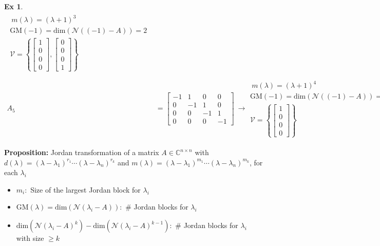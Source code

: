 \documentclass[twoside]{article}
\newtheorem{exmp}[theorem]{Ex}
\begin{document}
\begin{exmp}
\begin{align*}
\begin{array}{c} \ m(\lambda) = (\lambda + 1)^3 \\ \mathrm{GM}(-1) = \mathrm{dim}\left( \mathcal{N}((-1) - A) \right) = 2 
\\
\mathcal{V} = \left\lbrace  \left[ \begin{array}{c} 1 \\ 0 \\ 0 \\ 0  \end{array} \right] ,   \left[ \begin{array}{c} 0  \\ 0 \\ 0 \\ 1 \end{array} \right]  \right\rbrace 
\end{array}
\\
\\
A_5 &=   \left[ \begin{array}{cccc} -1 & 1 & 0 & 0  \\ 0 & -1 & 1 & 0 \\ 0 & 0 & -1 & 1 \\ 0 & 0 & 0 & -1 \end{array} \right] \ \rightarrow  
\begin{array}{c} \ m(\lambda) = (\lambda + 1)^4 \\ \mathrm{GM}(-1) = \mathrm{dim}\left( \mathcal{N}((-1) - A) \right) = 1
\\
\mathcal{V} = \left\lbrace  \left[ \begin{array}{c} 1 \\ 0 \\ 0 \\ 0  \end{array} \right]   \right\rbrace 
\end{array}
\end{align*}
\end{exmp}

\textbf{Proposition:} Jordan transformation of a matrix $A \in \mathbb{C}^{n \times n}$ with 
$d(\lambda) = (\lambda - \lambda_1)^{r_1} \cdots (\lambda - \lambda_n)^{r_k} $ and
$m(\lambda) = (\lambda - \lambda_1)^{m_1} \cdots (\lambda - \lambda_n)^{m_k} $, for each $\lambda_i$
%
\begin{itemize}
	\item $m_i :$ Size of the largest Jordan block for $\lambda_i$
	\item $\mathrm{GM}(\lambda) = \mathrm{dim}\left( \mathcal{N}(\lambda_i - A) \right) : $ \# Jordan blocks for $\lambda_i$
	\item $\mathrm{dim}\left( \mathcal{N}(\lambda_i - A)^k \right) - \mathrm{dim}\left( \mathcal{N}(\lambda_i - A)^{k-1} \right) : $ \# Jordan blocks for $\lambda_i$ with size $\geq k$
\end{itemize}
\end{document}
